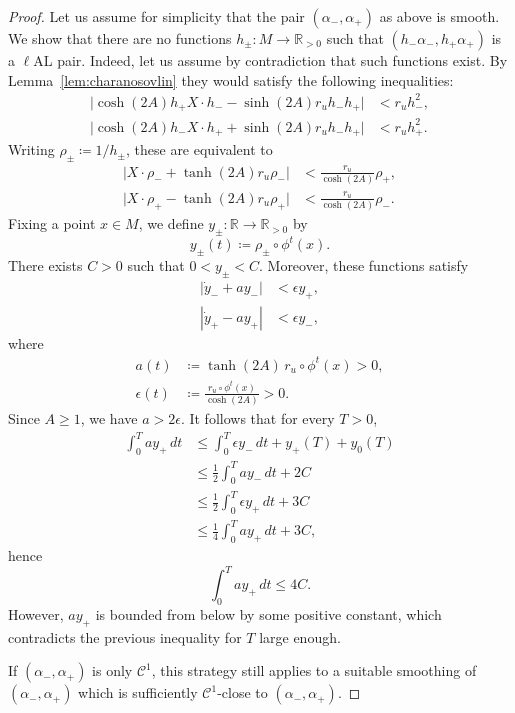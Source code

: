\documentclass[letterpaper, 11pt]{article}
\numberwithin{equation}{section}
\newcommand{\R}{\mathbb{R}}
\begin{document}
\begin{proof}
Let us assume for simplicity that the pair $(\alpha_-, \alpha_+)$ as above is smooth. We show that there are no functions $h_\pm : M \rightarrow \R_{>0}$ such that $(h_- \alpha_-, h_+ \alpha_+)$ is a $\ell$AL pair. Indeed, let us assume by contradiction that such functions exist. By Lemma~\ref{lem:charanosovlin} they would satisfy the following inequalities:
\begin{align*}
\vert \cosh(2A) h_+ X\cdot h_-  - \sinh(2A) r_u h_- h_+  \vert &< r_u h_-^2, \\
\vert \cosh(2A)  h_- X\cdot h_+ + \sinh(2A) r_u h_- h_+  \vert &< r_u h_+^2.
\end{align*}
Writing $\rho_\pm \coloneqq 1/h_\pm$, these are equivalent to 
\begin{align*}
\vert X\cdot \rho_-  +  \tanh(2A) r_u  \rho_-\vert &< \frac{r_u}{\cosh(2A)} \rho_+, \\
\vert  X\cdot \rho_+ - \tanh(2A) r_u \rho_+\vert &< \frac{r_u}{\cosh(2A)} \rho_-.
\end{align*}
Fixing a point $x \in M$, we define $y_\pm : \R \rightarrow \R_{>0}$ by $$y_\pm(t) \coloneqq \rho_\pm \circ \phi^t(x).$$ There exists $C  >0$ such that $0 <y_\pm < C$. Moreover, these functions satisfy
\begin{align*}
\left\vert \dot{y}_-  +  a y_- \right\vert &< \epsilon y_+, \\
\left\vert  \dot{y}_+ - a y_+ \right\vert &< \epsilon y_-,
\end{align*}
where 
\begin{align*}
a(t) &\coloneqq \tanh(2A) \, r_u \circ \phi^t (x)> 0, \\
\epsilon(t) &\coloneqq \frac{r_u \circ \phi^t(x)}{\cosh(2A)} > 0.
\end{align*}
Since $A \geq 1$, we have $a > 2 \epsilon$.
It follows that for every $T>0$, 
\begin{align*}
\int_0^T ay_+ \, dt &\leq \int_0^T \epsilon y_- \, dt + y_+(T) + y_0(T) \\
&\leq \frac{1}{2} \int_0^T a y_- \, dt + 2C \\
&\leq \frac{1}{2} \int_0^T \epsilon y_+ \, dt + 3C \\
& \leq \frac{1}{4} \int_0^T a y_+ \, dt + 3C,
\end{align*}
hence
$$ \int_0^T a y_+ \, dt \leq 4C.$$
However, $a y_+$ is bounded from below by some positive constant, which contradicts the previous inequality for $T$ large enough.

If $(\alpha_-, \alpha_+)$ is only $\mathcal{C}^1$, this strategy still applies to a suitable smoothing of $(\alpha_-, \alpha_+)$ which is sufficiently $\mathcal{C}^1$-close to $(\alpha_-, \alpha_+)$.
\end{proof}
\end{document}
